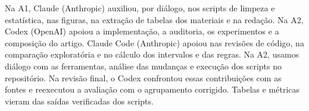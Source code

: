 Na A1, Claude (Anthropic) auxiliou, por diálogo, nos scripts de limpeza e estatística, nas figuras, na extração de tabelas dos materiais e na redação. Na A2, Codex (OpenAI) apoiou a implementação, a auditoria, os experimentos e a composição do artigo. Claude Code (Anthropic) apoiou nas revisões de código, na comparação exploratória e no cálculo dos intervalos e das regras. Na A2, usamos diálogo com as ferramentas, análise das mudanças e execução dos scripts no repositório. Na revisão final, o Codex confrontou essas contribuições com as fontes e reexecutou a avaliação com o agrupamento corrigido. Tabelas e métricas vieram das saídas verificadas dos scripts.
